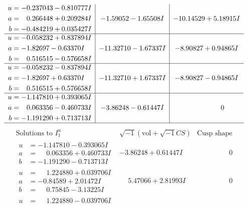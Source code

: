 \documentclass[1p]{elsarticle_modified}
\theoremstyle{definition}
\newcommand{\I}{\sqrt{-1}}
\begin{document}
$$\begin{array}{c|c|c}
\begin{aligned}
u &= -0.237043 - 0.810777 I \\
a &= \phantom{-}0.266448 + 0.209284 I \\
b &= -0.484219 + 0.035427 I\end{aligned}
 & -1.59052 - 1.65508 I & -10.14529 + 5.18915 I \\ \hline\begin{aligned}
u &= -0.058232 + 0.837894 I \\
a &= -1.82697 - 0.63370 I \\
b &= \phantom{-}0.516515 - 0.576658 I\end{aligned}
 & -11.32710 - 1.67337 I & -8.90827 + 0.94865 I \\ \hline\begin{aligned}
u &= -0.058232 - 0.837894 I \\
a &= -1.82697 + 0.63370 I \\
b &= \phantom{-}0.516515 + 0.576658 I\end{aligned}
 & -11.32710 + 1.67337 I & -8.90827 - 0.94865 I \\ \hline\begin{aligned}
u &= -1.147810 + 0.393065 I \\
a &= \phantom{-}0.063356 - 0.460733 I \\
b &= -1.191290 + 0.713713 I\end{aligned}
 & -3.86248 - 0.61447 I & \phantom{-0.000000 } 0\\
 \hline 
 \end{array}$$\newpage$$\begin{array}{c|c|c}  
\text{Solutions to }I^u_{1}& \I (\text{vol} + \sqrt{-1}CS) & \text{Cusp shape}\\
 \hline 
\begin{aligned}
u &= -1.147810 - 0.393065 I \\
a &= \phantom{-}0.063356 + 0.460733 I \\
b &= -1.191290 - 0.713713 I\end{aligned}
 & -3.86248 + 0.61447 I & \phantom{-0.000000 } 0 \\ \hline\begin{aligned}
u &= \phantom{-}1.224880 + 0.039706 I \\
a &= -0.84589 + 2.01472 I \\
b &= \phantom{-}0.75845 - 3.13225 I\end{aligned}
 & \phantom{-}5.47066 + 2.81993 I & \phantom{-0.000000 } 0 \\ \hline\begin{aligned}
u &= \phantom{-}1.224880 - 0.039706 I \\

\end{aligned}
\end{array}$$
\end{document}
